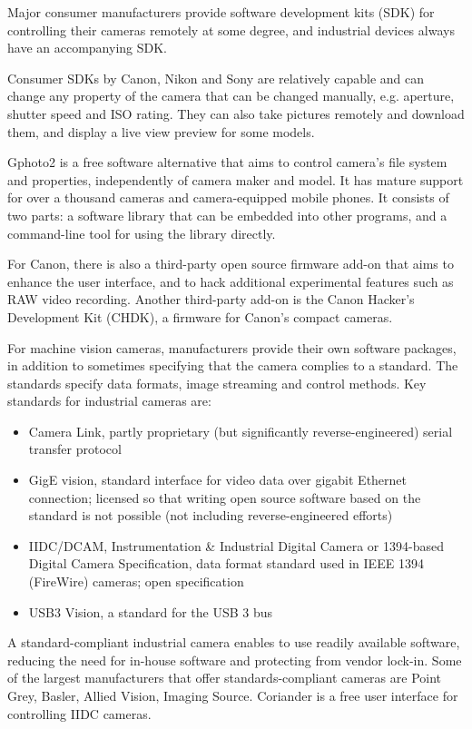 Major consumer manufacturers provide software development kits (SDK) for controlling their cameras remotely at some degree, and industrial devices always have an accompanying SDK.

Consumer SDKs by Canon, Nikon and Sony are relatively capable and can change any property of the camera that can be changed manually, e.g. aperture, shutter speed and ISO rating.
They can also take pictures remotely and download them, and display a live view preview for some models.

Gphoto2 is a free software alternative that aims to control camera's file system and properties, independently of camera maker and model.
It has mature support for over a thousand cameras and camera-equipped mobile phones.
It consists of two parts: a software library that can be embedded into other programs, and a command-line tool for using the library directly.

For Canon, there is also a third-party open source firmware add-on that aims to enhance the user interface, and to hack additional experimental features such as RAW video recording.
Another third-party add-on is the Canon Hacker's Development Kit (CHDK), a firmware for Canon's compact cameras.

For machine vision cameras, manufacturers provide their own software packages, in addition to sometimes specifying that the camera complies to a standard.
The standards specify data formats, image streaming and control methods.
Key standards for industrial cameras are:

\begin{itemize}
	\item Camera Link, partly proprietary (but significantly reverse-engineered) serial transfer protocol
	\item GigE vision, standard interface for video data over gigabit Ethernet connection; licensed so that writing open source software based on the standard is not possible (not including reverse-engineered efforts)
	\item IIDC/DCAM, Instrumentation \& Industrial Digital Camera or 1394-based Digital Camera Specification, data format standard used in IEEE 1394 (FireWire) cameras; open specification
	\item USB3 Vision, a standard for the USB 3 bus
\end{itemize}

A standard-compliant industrial camera enables to use readily available software, reducing the need for in-house software and protecting from vendor lock-in.
Some of the largest manufacturers that offer standards-compliant cameras are Point Grey, Basler, Allied Vision, Imaging Source.
Coriander \cite{} is a free user interface for controlling IIDC cameras.


